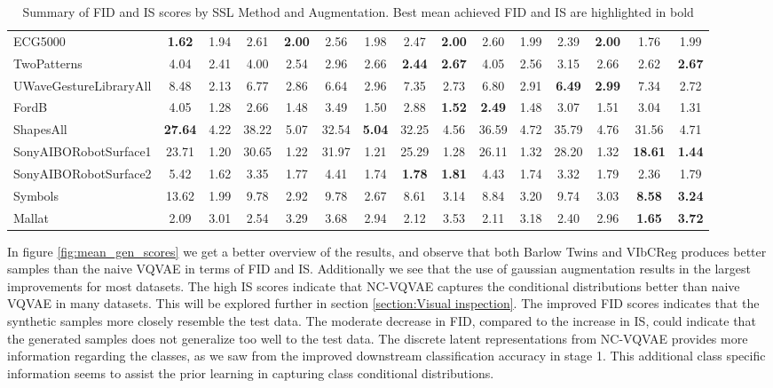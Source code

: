 \documentclass[../../thesis.tex]{subfiles}
\begin{document}
\begin{table}[H]
\begin{adjustbox}{width=\textwidth}
\begin{tabular}{lcc|cc|cc|cc|cc|cc|cc}
        ECG5000                 & \textbf{1.62} & 1.94 & 2.61 & \textbf{2.00} & 2.56 & 1.98 & 2.47 & \textbf{2.00} & 2.60 & 1.99 & 2.39 & \textbf{2.00} & 1.76 & 1.99 \\
        TwoPatterns             & 4.04 & 2.41 & 4.00 & 2.54 & 2.96 & 2.66 & \textbf{2.44} & \textbf{2.67} & 4.05 & 2.56 & 3.15 & 2.66 & 2.62 & \textbf{2.67} \\
        UWaveGestureLibraryAll  & 8.48 & 2.13 & 6.77 & 2.86 & 6.64 & 2.96 & 7.35 & 2.73 & 6.80 & 2.91 & \textbf{6.49} & \textbf{2.99} & 7.34 & 2.72 \\
        FordB                   & 4.05 & 1.28 & 2.66 & 1.48 & 3.49 & 1.50 & 2.88 & \textbf{1.52} & \textbf{2.49} & 1.48 & 3.07 & 1.51 & 3.04 & 1.31 \\
        ShapesAll               & \textbf{27.64} & 4.22 & 38.22 & 5.07 & 32.54 & \textbf{5.04} & 32.25 & 4.56 & 36.59 & 4.72 & 35.79 & 4.76 & 31.56 & 4.71 \\
        SonyAIBORobotSurface1   & 23.71 & 1.20 & 30.65 & 1.22 & 31.97 & 1.21 & 25.29 & 1.28 & 26.11 & 1.32 & 28.20 & 1.32 & \textbf{18.61} & \textbf{1.44} \\
        SonyAIBORobotSurface2   & 5.42 & 1.62 & 3.35 & 1.77 & 4.41 & 1.74 & \textbf{1.78} & \textbf{1.81} & 4.43 & 1.74 & 3.32 & 1.79 & 2.36 & 1.79 \\
        Symbols                 & 13.62 & 1.99 & 9.78 & 2.92 & 9.78 & 2.67 & 8.61 & 3.14 & 8.84 & 3.20 & 9.74 & 3.03 & \textbf{8.58} & \textbf{3.24} \\
        Mallat                  & 2.09 & 3.01 & 2.54 & 3.29 & 3.68 & 2.94 & 2.12 & 3.53 & 2.11 & 3.18 & 2.40 & 2.96 & \textbf{1.65} & \textbf{3.72} \\
        \bottomrule
    \end{tabular}
    \end{adjustbox}
    \caption{Summary of FID and IS scores by SSL Method and Augmentation. Best mean achieved FID and IS are highlighted in bold}
    \label{tab:FID_IS_mean}
\end{table}

In figure \ref{fig:mean_gen_scores} we get a better overview of the results, and observe that both Barlow Twins and VIbCReg produces better samples than the naive VQVAE in terms of FID and IS.
Additionally we see that the use of gaussian augmentation results in the largest improvements for most datasets. The high IS scores indicate that NC-VQVAE captures the conditional distributions better than naive VQVAE in many datasets. This will be explored further in section \ref{section:Visual inspection}. The improved FID scores indicates that the synthetic samples more closely resemble the test data. The moderate decrease in FID, compared to the increase in IS, could indicate that the generated samples does not generalize too well to the test data. The discrete latent representations from NC-VQVAE provides more information regarding the classes, as we saw from the improved downstream classification accuracy in stage 1. This additional class specific information seems to assist the prior learning in capturing class conditional distributions.
\end{document}
